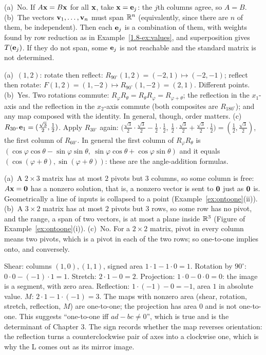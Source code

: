 \documentclass[11pt]{article}
\begin{document}
\begin{description}[leftmargin=0pt,itemsep=5pt]
  \item[Pause and think \ref{think:whyunit}.] (a)~No. If $A\mathbf{x}=B\mathbf{x}$ for all $\mathbf{x}$, take $\mathbf{x}=\mathbf{e}_j$: the $j$th columns agree, so $A=B$. (b)~The vectors $\mathbf{v}_1,\dots,\mathbf{v}_n$ must span $\mathbb{R}^n$ (equivalently, since there are $n$ of them, be independent). Then each $\mathbf{e}_j$ is a combination of them, with weights found by row reduction as in Example~\ref{1.8-ex:values}, and superposition gives $T(\mathbf{e}_j)$. If they do not span, some $\mathbf{e}_j$ is not reachable and the standard matrix is not determined.
  \item[Pause and think \ref{think:order}.] (a)~$(1,2)$: rotate then reflect: $R_{90^\circ}(1,2)=(-2,1)\mapsto(-2,-1)$; reflect then rotate: $F(1,2)=(1,-2)\mapsto R_{90^\circ}(1,-2)=(2,1)$. Different points. (b)~Yes. Two rotations commute: $R_\varphi R_\theta=R_\theta R_\varphi=R_{\varphi+\theta}$; the reflection in the $x_1$-axis and the reflection in the $x_2$-axis commute (both composites are $R_{180^\circ}$); and any map composed with the identity. In general, though, order matters. (c)~$R_{30^\circ}\mathbf{e}_1=(\tfrac{\sqrt3}{2},\tfrac12)$. Apply $R_{30^\circ}$ again: $\bigl(\tfrac{\sqrt3}{2}\cdot\tfrac{\sqrt3}{2}-\tfrac12\cdot\tfrac12,\ \tfrac12\cdot\tfrac{\sqrt3}{2}+\tfrac{\sqrt3}{2}\cdot\tfrac12\bigr)=(\tfrac12,\tfrac{\sqrt3}{2})$, the first column of $R_{60^\circ}$. In general the first column of $R_\varphi R_\theta$ is $(\cos\varphi\cos\theta-\sin\varphi\sin\theta,\ \sin\varphi\cos\theta+\cos\varphi\sin\theta)$ and it equals $(\cos(\varphi+\theta),\sin(\varphi+\theta))$: these are the angle-addition formulas.
  \item[Pause and think \ref{think:dimcount}.] (a)~A $2\times3$ matrix has at most $2$ pivots but $3$ columns, so some column is free: $A\mathbf{x}=\mathbf{0}$ has a nonzero solution, that is, a nonzero vector is sent to $\mathbf{0}$ just as $\mathbf{0}$ is. Geometrically a line of inputs is collapsed to a point (Example~\ref{ex:ontoone}(ii)). (b)~A $3\times2$ matrix has at most $2$ pivots but $3$ rows, so some row has no pivot, and the range, a span of two vectors, is at most a plane inside $\mathbb{R}^3$ (Figure of Example~\ref{ex:ontoone}(i)). (c)~No. For a $2\times2$ matrix, pivot in every column means two pivots, which is a pivot in each of the two rows; so one-to-one implies onto, and conversely.
  \item[Pause and think \ref{think:area}.] Shear: columns $(1,0),(1,1)$, signed area $1\cdot1-1\cdot0=1$. Rotation by $90^\circ$: $0\cdot0-(-1)\cdot1=1$. Stretch: $2\cdot1-0=2$. Projection: $1\cdot0-0\cdot0=0$: the image is a segment, with zero area. Reflection: $1\cdot(-1)-0=-1$, area $1$ in absolute value. $M$: $2\cdot1-1\cdot(-1)=3$. The maps with nonzero area (shear, rotation, stretch, reflection, $M$) are one-to-one; the projection has area $0$ and is not one-to-one. This suggests ``one-to-one iff $ad-bc\neq0$'', which is true and is the determinant of Chapter 3. The sign records whether the map reverses orientation: the reflection turns a counterclockwise pair of axes into a clockwise one, which is why the L comes out as its mirror image.

\end{description}
\end{document}
